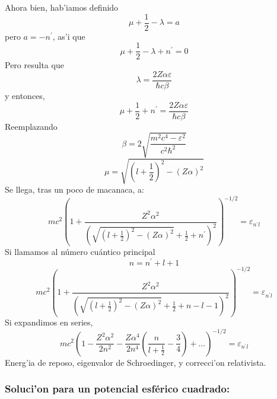 Ahora bien, hab'iamos definido
\begin{equation}
\mu+\frac{1}{2}-\lambda=a
\end{equation}
pero $a=-n^{\prime}$, as'i que
\begin{equation}
\mu+\frac{1}{2}-\lambda+n^{\prime}=0
\end{equation}
Pero resulta que
\begin{equation}
\lambda=\frac{2Z\alpha\varepsilon}{\hbar c\beta}%
\end{equation}
y entonces,
\begin{equation}
\mu+\frac{1}{2}+n^{\prime}=\frac{2Z\alpha\varepsilon}{\hbar c\beta}%
\end{equation}
Reemplazando
\begin{equation}
\beta=2\sqrt{\frac{m^{2}c^{4}-\varepsilon^{2}}{c^{2}\hbar^{2}}}%
\end{equation}
\begin{equation}
\mu=\sqrt{\left(  l+\frac{1}{2}\right)  ^{2}-\left(  Z\alpha\right)  ^{2}}%
\end{equation}
Se llega, tras un poco de macanaca, a:
\begin{equation}
mc^{2}\left(  1+\frac{Z^{2}\alpha^{2}}{\left(  \sqrt{\left(  l+\frac{1}%
{2}\right)  ^{2}-\left(  Z\alpha\right)  ^{2}}+\frac{1}{2}+n^{\prime}\right)
^{2}}\right)  ^{-1/2}=\varepsilon_{n^{\prime}l}%
\end{equation}
Si llamamos al n\'{u}mero cu\'{a}ntico principal
\begin{equation}
n=n^{\prime}+l+1
\end{equation}
\begin{equation}
mc^{2}\left(  1+\frac{Z^{2}\alpha^{2}}{\left(  \sqrt{\left(  l+\frac{1}%
{2}\right)  ^{2}-\left(  Z\alpha\right)  ^{2}}+\frac{1}{2}+n-l-1\right)  ^{2}%
}\right)  ^{-1/2}=\varepsilon_{n^{\prime}l}%
\end{equation}
Si expandimos en series,
\begin{equation}
mc^{2}\left(  1-\frac{Z^{2}\alpha^{2}}{2n^{2}}-\frac{Z\alpha^{4}}{2n^{4}%
}\left(  \frac{n}{l+\frac{1}{2}}-\frac{3}{4}\right)  +...\right)
^{-1/2}=\varepsilon_{n^{\prime}l}%
\end{equation}
Energ'ia de reposo, eigenvalor de Schroedinger, y correcci'on relativista.

\subsubsection{Soluci'on para un potencial esf\'{e}rico cuadrado:}%

